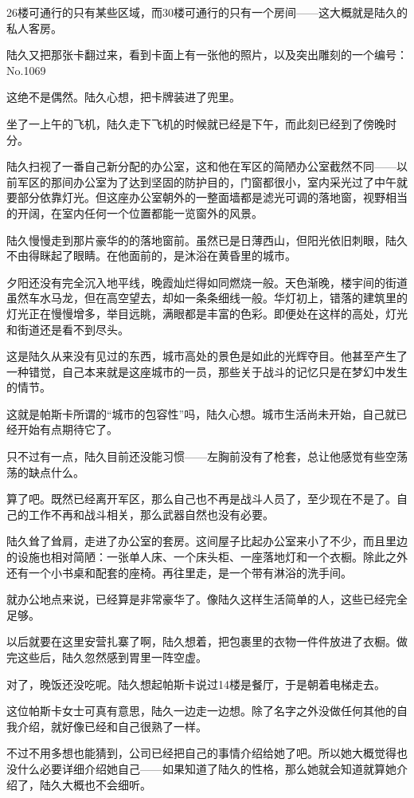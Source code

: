 26楼可通行的只有某些区域，而30楼可通行的只有一个房间——这大概就是陆久的私人客房。

陆久又把那张卡翻过来，看到卡面上有一张他的照片，以及突出雕刻的一个编号：No.1069

这绝不是偶然。陆久心想，把卡牌装进了兜里。

坐了一上午的飞机，陆久走下飞机的时候就已经是下午，而此刻已经到了傍晚时分。

陆久扫视了一番自己新分配的办公室，这和他在军区的简陋办公室截然不同——以前军区的那间办公室为了达到坚固的防护目的，门窗都很小，室内采光过了中午就要部分依靠灯光。但这座办公室朝外的一整面墙都是滤光可调的落地窗，视野相当的开阔，在室内任何一个位置都能一览窗外的风景。

陆久慢慢走到那片豪华的的落地窗前。虽然已是日薄西山，但阳光依旧刺眼，陆久不由得眯起了眼睛。在他面前的，是沐浴在黄昏里的城市。

夕阳还没有完全沉入地平线，晚霞灿烂得如同燃烧一般。天色渐晚，楼宇间的街道虽然车水马龙，但在高空望去，却如一条条细线一般。华灯初上，错落的建筑里的灯光正在慢慢增多，举目远眺，满眼都是丰富的色彩。即便处在这样的高处，灯光和街道还是看不到尽头。

这是陆久从来没有见过的东西，城市高处的景色是如此的光辉夺目。他甚至产生了一种错觉，自己本来就是这座城市的一员，那些关于战斗的记忆只是在梦幻中发生的情节。

这就是帕斯卡所谓的“城市的包容性”吗，陆久心想。城市生活尚未开始，自己就已经开始有点期待它了。

只不过有一点，陆久目前还没能习惯——左胸前没有了枪套，总让他感觉有些空荡荡的缺点什么。

算了吧。既然已经离开军区，那么自己也不再是战斗人员了，至少现在不是了。自己的工作不再和战斗相关，那么武器自然也没有必要。

陆久耸了耸肩，走进了办公室的套房。这间屋子比起办公室来小了不少，而且里边的设施也相对简陋：一张单人床、一个床头柜、一座落地灯和一个衣橱。除此之外还有一个小书桌和配套的座椅。再往里走，是一个带有淋浴的洗手间。

就办公地点来说，已经算是非常豪华了。像陆久这样生活简单的人，这些已经完全足够。

以后就要在这里安营扎寨了啊，陆久想着，把包裹里的衣物一件件放进了衣橱。做完这些后，陆久忽然感到胃里一阵空虚。

对了，晚饭还没吃呢。陆久想起帕斯卡说过14楼是餐厅，于是朝着电梯走去。

这位帕斯卡女士可真有意思，陆久一边走一边想。除了名字之外没做任何其他的自我介绍，就好像已经和自己很熟了一样。

不过不用多想也能猜到，公司已经把自己的事情介绍给她了吧。所以她大概觉得也没什么必要详细介绍她自己——如果知道了陆久的性格，那么她就会知道就算她介绍了，陆久大概也不会细听。

